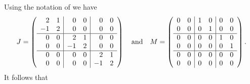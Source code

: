 Using the notation of  we have
\[
J = \left(\begin{array}{rr|rr|rr} 
 2 & 1 & 0 & 0 & 0 & 0\\
-1 & 2 & 0 & 0 & 0 & 0 \\  
 \hline
 0 & 0 & 2 & 1 & 0 & 0 \\
 0 & 0 &-1 & 2 & 0 & 0 \\
\hline
 0 & 0 & 0 & 0 & 2 & 1\\
 0 & 0 & 0 & 0 &-1 & 2  \end{array}\right) 
\quad\mbox{and}\quad 
M = \left(\begin{array}{rr|rr|rr} 
 0 & 0 & 1 & 0 & 0 & 0\\
0 & 0 & 0 & 1 & 0 & 0 \\  
 \hline
 0 & 0 & 0 & 0 & 1 & 0 \\
 0 & 0 & 0 & 0 & 0 & 1 \\
\hline
 0 & 0 & 0 & 0 & 0 & 0\\
 0 & 0 & 0 & 0 & 0 & 0  \end{array}\right).
\]
It follows that 

